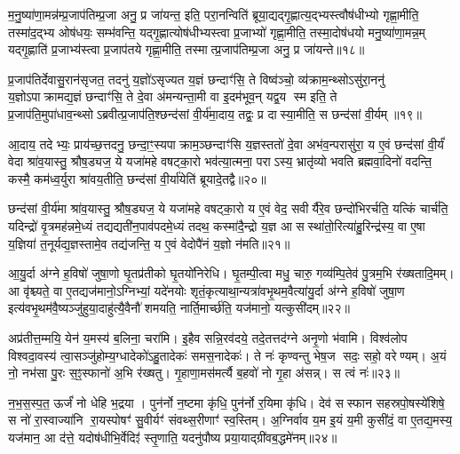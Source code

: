 म॒नु॒ष्या॑णा॒मन्न॑म्प्र॒जाप॑तिम्प्र॒जा अनु॒ प्र जा॑यन्त॒ इति॒ परा॒नन्विति॑ ब्रूया॒द्यद्गृ॒ह्णात्य॒द्भ्यस्त्वौष॑धीभ्यो गृह्णा॒मीति॒ तस्मा॑द॒द्भ्य ओष॑धयः॒ सम्भ॑वन्ति॒ यद्गृ॒ह्णात्योष॑धीभ्यस्त्वा प्र॒जाभ्यो॑ गृह्णा॒मीति॒ तस्मा॒दोष॑धयो मनु॒ष्या॑णा॒मन्न॒म् यद्गृ॒ह्णाति॑ प्र॒जाभ्य॑स्त्वा प्र॒जाप॑तये गृह्णा॒मीति॒ तस्मात्प्र॒जाप॑तिम्प्र॒जा अनु॒ प्र जा॑यन्ते॥१८॥

{\anuvakamend[{अ॒भिजि॑त्या॒ ओष॑धयो॒ऽष्टाच॑त्वारिशच्च॥६॥}]}

प्र॒जाप॑तिर्देवासु॒रान॑सृजत॒ तदनु॑ य॒ज्ञो॑ऽसृज्यत य॒ज्ञं छन्दाꣳ॑सि॒ ते विष्व॑ञ्चो॒ व्य॑क्राम॒न्थ्सोऽसु॑रा॒ननु॑ य॒ज्ञोऽपाक्रामद्य॒ज्ञं छन्दाꣳ॑सि॒ ते दे॒वा अ॑मन्यन्ता॒मी वा इ॒दम॑भूव॒न् यद्व॒य स्म इति॒ ते प्र॒जाप॑ति॒मुपा॑धाव॒न्थ्सोऽब्रवीत्प्र॒जाप॑ति॒श्छन्द॑सां वी॒र्य॑मा॒दाय॒ तद्वः॒ प्र दास्या॒मीति॒ स छन्द॑सां वी॒र्यम्॥१९॥

आ॒दाय॒ तदेभ्यः॒ प्राय॑च्छ॒त्तदनु॒ छन्दा॒ꣳ॒स्यपाक्राम॒ञ्छन्दाꣳ॑सि य॒ज्ञस्ततो॑ दे॒वा अभ॑व॒न्परासु॑रा॒ य ए॒वं छन्द॑सां वी॒र्यं॑ वेदा श्रा॑व॒यास्तु॒ श्रौष॒ड्यज॒ ये यजा॑महे वषट्का॒रो भव॑त्या॒त्मना॒ पराऽस्य॒ भ्रातृ॑व्यो भवति ब्रह्मवा॒दिनो॑ वदन्ति॒ कस्मै॒ कम॑ध्व॒र्युरा श्रा॑वय॒तीति॒ छन्द॑सां वी॒र्या॑येति॑ ब्रूयादे॒तद्वै॥२०॥

छन्द॑सां वी॒र्य॑मा श्रा॑व॒यास्तु॒ श्रौष॒ड्यज॒ ये यजा॑महे वषट्का॒रो य ए॒वं वेद॒ सवीर्यैरे॒व छन्दो॑भिरर्चति॒ यत्किं चार्च॑ति॒ यदिन्द्रो॑ वृ॒त्रमह॑न्नमे॒ध्यं तद्यद्यती॑न॒पाव॑पदमे॒ध्यं तदथ॒ कस्मा॑दै॒न्द्रो य॒ज्ञ आ सस्था॑तो॒रित्या॑हु॒रिन्द्र॑स्य॒ वा ए॒षा य॒ज्ञिया॑ त॒नूर्यद्य॒ज्ञस्तामे॒व तद्य॑जन्ति॒ य ए॒वं वेदोपै॑नं य॒ज्ञो न॑मति॥२१॥

{\anuvakamend[{स छन्द॑सां वी॒र्यं॑ वा ए॒व तद॒ष्टौ च॑॥७॥}]}

आ॒यु॒र्दा अ॑ग्ने ह॒विषो॑ जुषा॒णो घृ॒तप्र॑तीको घृ॒तयो॑निरेधि। घृ॒तम्पी॒त्वा मधु॒ चारु॒ गव्य॑म्पि॒तेव॑ पु॒त्रम॒भि र॑ख्षतादि॒मम्। आ वृ॑श्च्यते॒ वा ए॒तद्यज॑मानो॒ऽग्निभ्यां॒ यदे॑नयोः शृतं॒कृत्याथा॒न्यत्रा॑वभृ॒थम॒वैत्या॑यु॒र्दा अ॑ग्ने ह॒विषो॑ जुषा॒ण इत्य॑वभृ॒थम॑वै॒ष्यञ्जु॑हुया॒दाहु॑त्यै॒वैनौ॑ शमयति॒ नार्ति॒मार्च्छ॑ति॒ यज॑मानो॒ यत्कुसी॑दम्॥२२॥

अप्र॑तीत्त॒म्मयि॒ येन॑ य॒मस्य॑ ब॒लिना॒ चरा॑मि। इ॒हैव सन्नि॒रव॑दये॒ तदे॒तत्तद॑ग्ने अनृ॒णो भ॑वामि। विश्व॑लोप विश्वदा॒वस्य॑ त्वा॒सञ्जु॑होम्य॒ग्धादेको॑ऽहु॒तादेकः॑ समस॒नादेकः॑। ते नः॑ कृण्वन्तु भेष॒ज सदः॒ सहो॒ वरेण्यम्। अ॒यं नो॒ नभ॑सा पु॒रः स॒ꣵ॒स्फानो॑ अ॒भि र॑ख्षतु। गृ॒हाणा॒मस॑मर्त्यै ब॒हवो॑ नो गृ॒हा अ॑सन्न्। स त्वं नः॑॥२३॥

न॒भ॒स॒स्प॒त॒ ऊर्जं॑ नो धेहि भ॒द्रया। पुन॑र्नो न॒ष्टमा कृ॑धि॒ पुन॑र्नो र॒यिमा कृ॑धि। देव॑ सस्फान सहस्रपो॒षस्ये॑शिषे॒ स नो॑ रा॒स्वाज्या॑नि रा॒यस्पोषꣳ॑ सु॒वीर्यꣳ॑ संवथ्स॒रीणाꣳ॑ स्व॒स्तिम्। अ॒ग्निर्वाव य॒म इ॒यं य॒मी कुसी॑दं॒ वा ए॒तद्य॒मस्य॒ यज॑मान॒ आ द॑त्ते॒ यदोष॑धीभि॒र्वेदिꣵ॑ स्तृ॒णाति॒ यदनु॑पौष्य प्रया॒याद्ग्री॑वब॒द्धमे॑नम्॥२४॥


